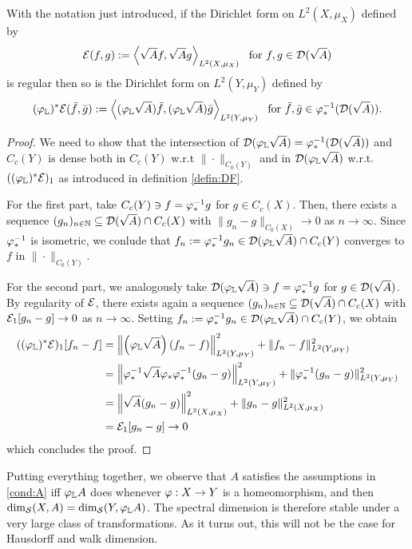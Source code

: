 \begin{lem}
  With the notation just introduced, if the Dirichlet form on $L^2(X,\mu_X)$ defined by 
  \[
    \cE(f,g):=\left<\sqrt{A}f,\sqrt{A}g\right>_{L^2(X,\mu_X)}\ \text{ for } f,g\in\cD(\sqrt{A})
  \]
 is regular then so is the Dirichlet form on $L^2(Y,\mu_Y)$ defined by 
 \[
   (\varphi_{\mathbb{L}})^*\mathcal{E}(\bar f,\bar g):=\left<(\varphi_{\mathbb{L}}\sqrt{A})\bar f,(\varphi_{\mathbb{L}}\sqrt{A})\bar g\right>_{L^2(Y,\mu_Y)}\ \text{ for } \bar f,\bar g\in\varphi_*^{-1}(\mathcal{D}(\sqrt{A})).
 \]
\end{lem}
\begin{proof}
  We need to show that the intersection of $\mathcal{D}(\varphi_{\mathbb{L}}\sqrt{A})=\varphi_*^{-1}(\mathcal{D}(\sqrt{A}))$ and $C_c(Y)$ is dense both in $C_c(Y)$ w.r.t $\|\cdot\|_{C_0(Y)}$ and in $\mathcal{D}(\varphi_{\mathbb{L}}\sqrt{A})$ w.r.t. $((\varphi_{\mathbb{L}})^*\mathcal{E})_1$ as introduced in definition \ref{defin:DF}.
  
  For the first part, take $C_c(Y)\ni f=\varphi_*^{-1} g$ for $g\in C_c(X)$. Then, there exists a sequence $(g_n)_{n\in\mathbb{N}}\subseteq \mathcal{D}(\sqrt{A})\cap C_c(X)$ with $\|g_n-g\|_{C_0(X)}\to 0$ as $n\to\infty$. Since $\varphi_*^{-1}$ is isometric, we conlude that $f_n:=\varphi_*^{-1}g_n\in \mathcal{D}(\varphi_{\mathbb{L}}\sqrt{A})\cap C_c(Y)$ converges to $f$ in 
  $\|\cdot\|_{C_0(Y)}$.
  
  For the second part, we analogously take $\mathcal{D}(\varphi_{\mathbb{L}}\sqrt{A})\ni f=\varphi_*^{-1} g$ for $g\in\mathcal{D}(\sqrt{A})$. By regularity of $\mathcal{E}$, there exists again a sequence $(g_n)_{n\in\mathbb{N}}\subseteq\mathcal{D}(\sqrt{A})\cap C_c(X)$ with $\mathcal{E}_1[g_n-g]\to 0$ as $n\to\infty$. Setting $f_n:=\varphi_*^{-1} g_n\in\mathcal{D}(\varphi_{\mathbb{L}}\sqrt{A})\cap C_c(Y)$, we obtain
  \begin{align*}
    ((\varphi_{\mathbb{L}})^*\mathcal{E})_1[f_n-f]
    &=\left\|\left(\varphi_{\mathbb{L}}\sqrt{A}\right)(f_n-f)\right\|_{L^2(Y,\mu_Y)}^2
        +\|f_n-f\|_{L^2(Y,\mu_Y)}^2\\
    &=\left\|\varphi_*^{-1}\sqrt{A}\varphi_*\varphi_*^{-1}(g_n-g)\right\|_{L^2(Y,\mu_Y)}^2
        +\|\varphi_*^{-1}(g_n-g)\|_{L^2(Y,\mu_Y)}^2\\
    &=\left\|\sqrt{A}(g_n-g)\right\|_{L^2(X,\mu_X)}^2+\|g_n-g\|_{L^2(X,\mu_X)}^2\\
    &=\mathcal{E}_1[g_n-g]\to 0
  \end{align*}
  which concludes the proof.
\end{proof}

Putting everything together, we observe that $A$ satisfies the assumptions in \ref{cond:A} iff $\varphi_{\mathbb{L}} A$ does whenever $\varphi:X\to Y$ is a homeomorphism, and then $\dim_{\mathcal{S}}(X,A)=\dim_{\mathcal{S}}(Y,\varphi_{\mathbb{L}} A)$. The spectral dimension is therefore stable under a very large class of transformations. As it turns out, this will not be the case for Hausdorff and walk dimension. 

